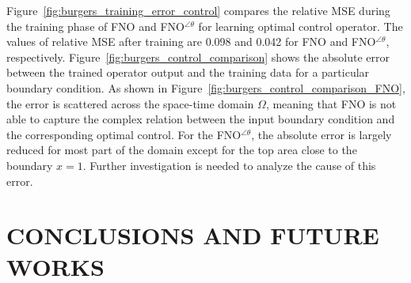 \documentclass[letterpaper, 10 pt, conference]{ieeeconf}  %
\begin{document}
Figure~\ref{fig:burgers_training_error_control} compares the relative MSE during the training phase of FNO and FNO$^{\angle \theta}$ for learning optimal control operator.
The values of relative MSE after training are 0.098 and 0.042 for FNO and FNO$^{\angle\theta}$, respectively.
Figure~\ref{fig:burgers_control_comparison} shows the absolute error between the trained operator output and the training data for a particular boundary condition.
As shown in Figure~\ref{fig:burgers_control_comparison_FNO}, the error is scattered across the space-time domain $\Omega$, meaning that FNO is not able to capture the complex relation between the input boundary condition and the corresponding optimal control.
For the FNO$^{\angle \theta}$, the absolute error is largely reduced for most part of the domain except for the top area close to the boundary $x=1$.
Further investigation is needed to analyze the cause of this error.





\section{CONCLUSIONS AND FUTURE WORKS}
\end{document}
